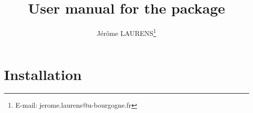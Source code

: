 \documentclass{article}
\begin{document}
\title{User manual for the  package}
\author{Jérôme LAURENS\thanks{E-mail: jerome.laurens@u-bourgogne.fr}}
\maketitle
\tableofcontents
\section{Installation}

%
%
\end{document}

